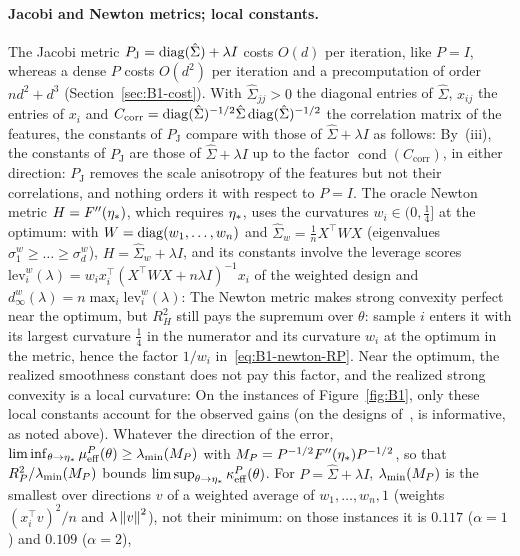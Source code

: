 \paragraph{Jacobi and Newton metrics; local constants.}
The Jacobi metric $P_{\mathrm J}=\operatorname{diag}(\hat\Sigma)+\lambda I$ costs $O(d)$ per iteration, like $P=I$, whereas a dense
$P$ costs $O(d^2)$ per iteration and a precomputation of order $nd^2+d^3$ (Section~\ref{sec:B1-cost}). With
$\hat\Sigma_{jj}>0$ the diagonal entries of $\hat\Sigma$, $x_{ij}$ the entries of $x_i$ and
$C_{\mathrm{corr}}=\operatorname{diag}(\hat\Sigma)^{-1/2}\hat\Sigma\operatorname{diag}(\hat\Sigma)^{-1/2}$ the correlation matrix of the features,
the constants of $P_{\mathrm J}$ compare with those of $\hat\Sigma+\lambda I$ as follows:
By~(iii), the constants of $P_{\mathrm J}$ are those of $\hat\Sigma+\lambda I$ up to the factor
$\operatorname{cond}(C_{\mathrm{corr}})$, in either direction: $P_{\mathrm J}$ removes the scale anisotropy of the
features but not their correlations, and nothing orders it with respect to $P=I$. The oracle Newton metric
$H=F''(\eta_\ast)$, which requires $\eta_\ast$, uses the curvatures $w_i\in(0,\frac14]$ at the optimum: with
$W=\operatorname{diag}(w_1,\dots,w_n)$ and $\hat\Sigma_w=\frac1nX^\top WX$ (eigenvalues $\sigma^w_1\ge\dots\ge\sigma^w_d$),
$H=\hat\Sigma_w+\lambda I$, and its constants involve the leverage scores
$\mathrm{lev}^w_i(\lambda)=w_ix_i^\top(X^\top WX+n\lambda I)^{-1}x_i$ of the weighted design and
$d^w_\infty(\lambda)=n\max_i\mathrm{lev}^w_i(\lambda)$:
The Newton metric makes strong convexity perfect near the optimum, but $R_H^2$ still pays the supremum over $\theta$:
sample $i$ enters it with its largest curvature $\frac14$ in the numerator and its curvature $w_i$ at the optimum in the
metric, hence the factor $1/w_i$ in~\eqref{eq:B1-newton-RP}. Near the optimum, the realized smoothness constant does
not pay this factor, and the realized strong convexity is a local curvature:
On the instances of Figure~\ref{fig:B1}, only these local constants account for the observed gains (on the designs
of~\cite{na2023hessian},  is informative, as noted above). Whatever the direction of the
error, $\liminf_{\theta\to\eta_\ast}\mu_{\mathrm{eff}}^P(\theta)\ge\lambda_{\min}(M_P)$ with $M_P=P^{-1/2}F''(\eta_\ast)P^{-1/2}$, so that
$R_P^2/\lambda_{\min}(M_P)$ bounds $\limsup_{\theta\to\eta_\ast}\kappa^P_{\mathrm{eff}}(\theta)$. For $P=\hat\Sigma+\lambda I$,
$\lambda_{\min}(M_P)$ is the smallest over directions $v$ of a weighted average of $w_1,\dots,w_n,1$ (weights $(x_i^\top v)^2/n$
and $\lambda\left\|v\right\|^2$), not their minimum: on those instances it is $0.117$ ($\alpha=1$) and $0.109$ ($\alpha=2$),
